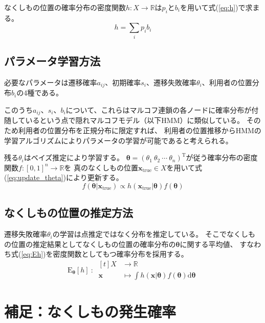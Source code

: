 \documentclass{jarticle}
\begin{document}
なくしもの位置の確率分布の密度関数$h:X \rightarrow \mathbb{R}$は$p_i$と$b_i$を用いて式(\ref{eq:h})で求まる。
\begin{equation}
    \label{eq:h}
    h = \sum_{i} {p_i b_i}
\end{equation}


\subsection{パラメータ学習方法}
必要なパラメータは遷移確率$a_{i j}$、初期確率$s_i$、遷移失敗確率$\theta_i$、利用者の位置分布$b_i$の4種である。

このうち$a_{i j}$、$s_i$、$b_i$について、これらはマルコフ連鎖の各ノードに確率分布が付随しているという点で隠れマルコフモデル（以下HMM）に類似している。
そのため利用者の位置分布を正規分布に限定すれば、
利用者の位置推移からHMMの学習アルゴリズムによりパラメータの学習が可能であると考えられる。

残る$\theta_i$はベイズ推定により学習する。
$\bm{\theta} = (\theta_1\ \theta_2\ \cdots\ \theta_n)^\mathrm{T}$が従う確率分布の密度関数$f:[0,1]^n \rightarrow \mathbb{R}$を
真のなくしもの位置$\bm{x}_\mathrm{true} \in X$を用いて式(\ref{eq:update_theta})により更新する。
\begin{equation}
    \label{eq:update_theta}
    f(\bm{\theta} | \bm{x}_\mathrm{true}) \propto h(\bm{x}_\mathrm{true} | \bm{\theta}) f(\bm{\theta})
\end{equation}


\subsection{なくしもの位置の推定方法}
遷移失敗確率$\theta_i$の学習は点推定ではなく分布を推定している。
そこでなくしもの位置の推定結果としてなくしもの位置の確率分布の$\bm{\theta}$に関する平均値、
すなわち式(\ref{eq:Eh})を密度関数としてもつ確率分布を採用する。
\begin{equation}
    \label{eq:Eh}
    \mathrm{E}_\bm{\theta} [h]\ :\ 
    \begin{aligned}[t]
        X &\rightarrow \mathbb{R} \\
        \bm{x} &\mapsto \int {h(\bm{x} | \bm{\theta}) f(\bm{\theta}) \mathrm{d} \bm{\theta}}
    \end{aligned}
\end{equation}


\section{補足：なくしもの発生確率}
\label{sec:calc_p}
\end{document}
